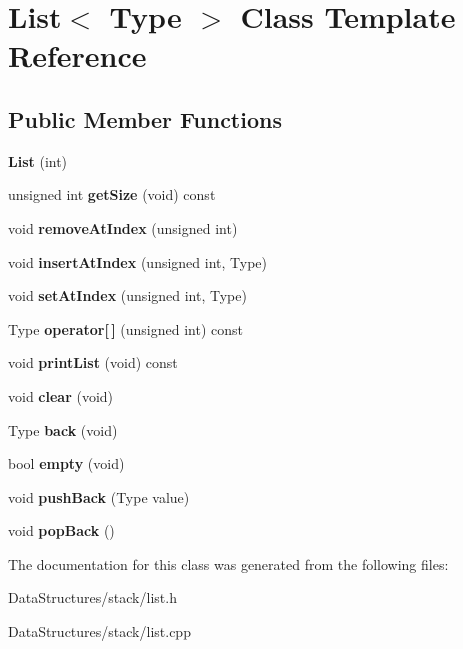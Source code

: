 \hypertarget{classList}{}\section{List$<$ Type $>$ Class Template Reference}
\label{classList}
\subsection*{Public Member Functions}
\begin{DoxyCompactItemize}
\item 
\mbox{\label{classList_a26e543c381726b6e9fc0edc2997c1009}} 
{\bfseries List} (int)
\item 
\mbox{\label{classList_a261ca8c729d011b0ff08a4da4d5b9d2f}} 
unsigned int {\bfseries get\+Size} (void) const
\item 
\mbox{\label{classList_a07496984175b07818abe40573209c7d1}} 
void {\bfseries remove\+At\+Index} (unsigned int)
\item 
\mbox{\label{classList_afef72ae14d1dc037bfda14ec555f4856}} 
void {\bfseries insert\+At\+Index} (unsigned int, Type)
\item 
\mbox{\label{classList_a8a1748e3792f7c0ee8ff1a89f823b159}} 
void {\bfseries set\+At\+Index} (unsigned int, Type)
\item 
\mbox{\label{classList_a3898d41810652b70aa2e2089c39bfdde}} 
Type {\bfseries operator\mbox{[}$\,$\mbox{]}} (unsigned int) const
\item 
\mbox{\label{classList_a0bb7f24f38d860cc5b7e58961eeca294}} 
void {\bfseries print\+List} (void) const
\item 
\mbox{\label{classList_a2d5977549c7c99d2fe92aece3265f06a}} 
void {\bfseries clear} (void)
\item 
\mbox{\label{classList_ab7b810c9f307470ccf357d0ba328f5b5}} 
Type {\bfseries back} (void)
\item 
\mbox{\label{classList_a9326434dfbb5adf23aac5040e9d7a8f7}} 
bool {\bfseries empty} (void)
\item 
\mbox{\label{classList_ad69aa8e4c38ee6a5bf07f8cdd5047bd1}} 
void {\bfseries push\+Back} (Type value)
\item 
\mbox{\label{classList_ad580c7d0cc671fcad5eae73932e1dd55}} 
void {\bfseries pop\+Back} ()
\end{DoxyCompactItemize}


The documentation for this class was generated from the following files\+:\begin{DoxyCompactItemize}
\item 
Data\+Structures/stack/list.\+h\item 
Data\+Structures/stack/list.\+cpp\end{DoxyCompactItemize}
